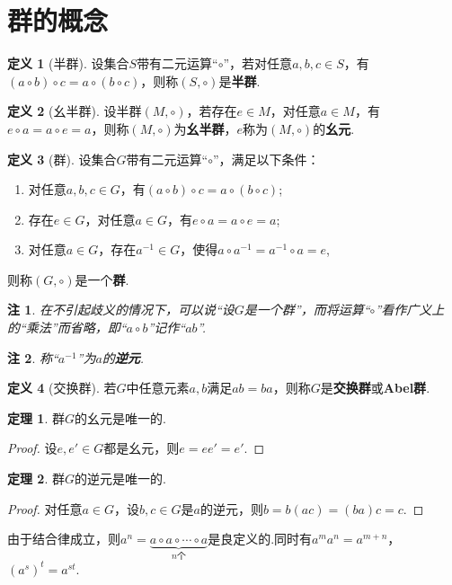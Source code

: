 \documentclass[12pt]{ctexart}
\theoremstyle{definition}
\newtheorem{definition}{定义}[section]
\newtheorem{theorem}{定理}[section]
\theoremstyle{plain}
\newtheorem*{remark}{注}
\begin{document}
\section{群的概念}
\begin{definition}[半群]
	设集合$S$带有二元运算“$\circ$”，若对任意$a,b,c\in S$，有$(a\circ b)\circ c=a\circ(b\circ c)$，则称$(S,\circ)$是\textbf{半群}.
\end{definition}
\begin{definition}[幺半群]
	设半群$(M,\circ)$，若存在$e\in M$，对任意$a\in M$，有$e\circ a=a\circ e=a$，则称$(M,\circ)$为\textbf{幺半群}，$e$称为$(M,\circ)$的\textbf{幺元}.
\end{definition}
\begin{definition}[群]
	设集合$G$带有二元运算“$\circ$”，满足以下条件：
	\begin{enumerate}
		\item 对任意$a,b,c\in G$，有$(a\circ b)\circ c=a\circ (b\circ c)$;
		\item 存在$e\in G$，对任意$a\in G$，有$e\circ a=a\circ e=a$;
		\item 对任意$a\in G$，存在$a^{-1}\in G$，使得$a\circ a^{-1}=a^{-1}\circ a=e$,
	\end{enumerate}
	则称$(G,\circ)$是一个\textbf{群}.
\end{definition}
\begin{remark}
	在不引起歧义的情况下，可以说“设$G$是一个群”，而将运算“$\circ$”看作广义上的“乘法”而省略，即“$a\circ b$”记作“$ab$”.
\end{remark}
\begin{remark}
	称“$a^{-1}$”为$a$的\textbf{逆元}.
\end{remark}
\begin{definition}[交换群]
	若$G$中任意元素$a,b$满足$ab=ba$，则称$G$是\textbf{交换群}或\textbf{Abel群}.
\end{definition}
\begin{theorem}
	群$G$的幺元是唯一的.
\end{theorem}
\begin{proof}
	设$e,e'\in G$都是幺元，则$e=ee'=e'$.
\end{proof}
\begin{theorem}
	群$G$的逆元是唯一的.
\end{theorem}
\begin{proof}
	对任意$a\in G$，设$b,c\in G$是$a$的逆元，则$b=b(ac)=(ba)c=c$.
\end{proof}
由于结合律成立，则$a^n=\underbrace{a\circ a\circ\cdots\circ a}_{n\text{个}}$是良定义的.同时有$a^ma^n=a^{m+n}$，$(a^s)^t=a^{st}$.
\end{document}
